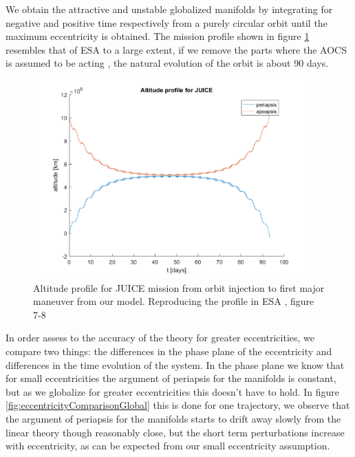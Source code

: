 We obtain the attractive and unstable globalized manifolds by integrating for negative and positive time respectively from a purely circular orbit until the maximum eccentricity is obtained. The mission profile shown in figure \ref{fig:missionProfile} resembles that of ESA to a large extent, if we remove the parts where the AOCS is assumed to be acting \cite{esa2014juice}, the natural evolution of the orbit is about 90 days.

\begin{figure}[H]
	\centering
	\includegraphics[height=3in]
	{figures/GanymedeESA/missionProfile.png}
	\caption{Altitude profile for JUICE mission from orbit injection to first major maneuver from our model. Reproducing the profile in ESA \cite{esa2011juice}, figure 7-8}
	\label{fig:missionProfile}
\end{figure}

In order assess to the accuracy of the theory for greater eccentricities, we compare two things: the differences in the phase plane of the eccentricity and differences in the time evolution of the system. In the phase plane we know that for small eccentricities the argument of periapsis for the manifolds is constant, but as we globalize for greater eccentricities this doesn't have to hold. In figure \ref{fig:eccentricityComparisonGlobal} this is done for one trajectory, we observe that the argument of periapsis for the manifolds starts to drift away slowly from the linear theory though reasonably close, but the short term perturbations increase with eccentricity, as can be expected from our small eccentricity assumption. 

